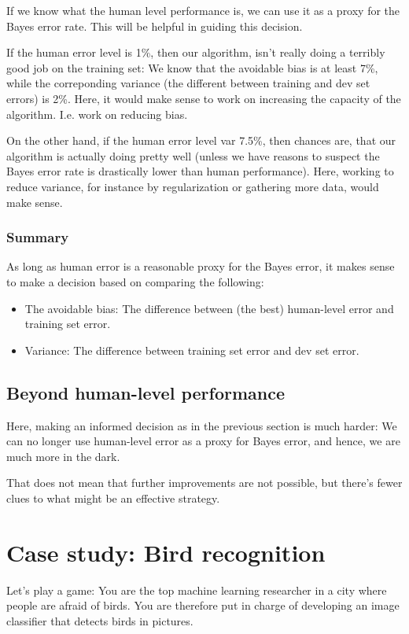 \documentclass[12pt, a4paper]{article}
\numberwithin{equation}{section}
\begin{document}
If we know what the human level performance is, we can use it as a proxy for the Bayes error rate. This will be helpful in guiding this decision.

If the human error level is 1\%, then our algorithm, isn't really doing a terribly good job on the training set: We know that the avoidable bias is at least 7\%, while the correponding variance (the different between training and dev set errors) is 2\%. Here, it would make sense to work on increasing the capacity of the algorithm. I.e. work on reducing bias.

On the other hand, if the human error level var 7.5\%, then chances are, that our algorithm is actually doing pretty well (unless we have reasons to suspect the Bayes error rate is drastically lower than human performance). Here, working to reduce variance, for instance by regularization or gathering more data, would make sense.

\subsubsection{Summary}
As long as human error is a reasonable proxy for the Bayes error, it makes sense to make a decision based on comparing the following:
\begin{itemize}
\item The avoidable bias: The difference between (the best) human-level error and training set error.
\item Variance: The difference between training set error and dev set error.
\end{itemize}

\subsection{Beyond human-level performance}
Here, making an informed decision as in the previous section is much harder: We can no longer use human-level error as a proxy for Bayes error, and hence, we are much more in the dark.

That does not mean that further improvements are not possible, but there's fewer clues to what might be an effective strategy.

\section{Case study: Bird recognition}
Let's play a game: You are the top machine learning researcher in a city where people are afraid of birds. You are therefore put in charge of developing an image classifier that detects birds in pictures.
\end{document}
